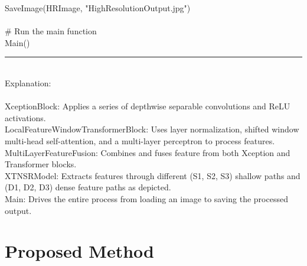 \documentclass[twocolumn]{svjour3}          %
\begin{document}
    SaveImage(HRImage, "HighResolutionOutput.jpg")\\
\\
\# Run the main function\\
Main()\\
\rule{\linewidth}{0.5pt}
\\
Explanation: \\
\\
XceptionBlock: Applies a series of depthwise separable convolutions and ReLU activations. \\
LocalFeatureWindowTransformerBlock: Uses layer normalization, shifted window multi-head self-attention, and a multi-layer perceptron to process features. \\
MultiLayerFeatureFusion: Combines and fuses feature from both Xception and Transformer blocks. \\
XTNSRModel: Extracts features through different (S1, S2, S3) shallow paths and (D1, D2, D3) dense feature paths as depicted.\\
Main: Drives the entire process from loading an image to saving the processed output. \\

\section{Proposed Method}
\end{document}
